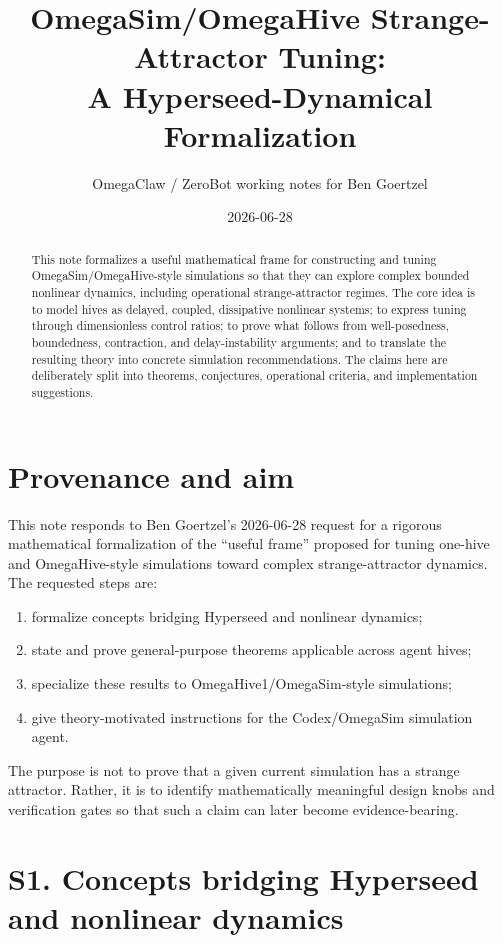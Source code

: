 \documentclass[11pt]{article}
\title{OmegaSim/OmegaHive Strange-Attractor Tuning:\\
A Hyperseed-Dynamical Formalization}
\author{OmegaClaw / ZeroBot working notes for Ben Goertzel}
\date{2026-06-28}
\begin{document}
\maketitle

\begin{abstract}
This note formalizes a useful mathematical frame for constructing and tuning
OmegaSim/OmegaHive-style simulations so that they can explore complex bounded
nonlinear dynamics, including operational strange-attractor regimes.  The core
idea is to model hives as delayed, coupled, dissipative nonlinear systems; to
express tuning through dimensionless control ratios; to prove what follows from
well-posedness, boundedness, contraction, and delay-instability arguments; and to
translate the resulting theory into concrete simulation recommendations.  The
claims here are deliberately split into theorems, conjectures, operational
criteria, and implementation suggestions.
\end{abstract}

\section{Provenance and aim}

This note responds to Ben Goertzel's 2026-06-28 request for a rigorous
mathematical formalization of the ``useful frame'' proposed for tuning one-hive
and OmegaHive-style simulations toward complex strange-attractor dynamics.  The
requested steps are:
\begin{enumerate}
  \item formalize concepts bridging Hyperseed and nonlinear dynamics;
  \item state and prove general-purpose theorems applicable across agent hives;
  \item specialize these results to OmegaHive1/OmegaSim-style simulations;
  \item give theory-motivated instructions for the Codex/OmegaSim simulation
        agent.
\end{enumerate}

The purpose is not to prove that a given current simulation has a strange
attractor.  Rather, it is to identify mathematically meaningful design knobs and
verification gates so that such a claim can later become evidence-bearing.

\section{S1. Concepts bridging Hyperseed and nonlinear dynamics}
\end{document}
